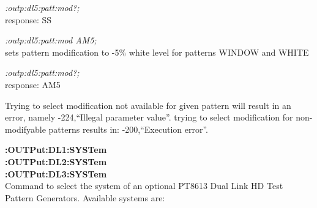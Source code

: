 \textit{:outp:dl5:patt:mod?;}\\
response: SS

\textit{:outp:dl5:patt:mod AM5;}\\
sets pattern modification to -5\% white level for patterns WINDOW and WHITE

\textit{:outp:dl5:patt:mod?;}\\
response: AM5

Trying to select modification not available for given pattern will result in an error, namely -224,``Illegal parameter value''. trying to select modification for non-modifyable patterns results in: -200,``Execution error''.

\textbf{:OUTPut:DL1:SYSTem}\\
\textbf{:OUTPut:DL2:SYSTem}\\
\textbf{:OUTPut:DL3:SYSTem}\\
Command to select the system of an optional PT8613 Dual Link HD Test Pattern Generators.  Available systems are:

